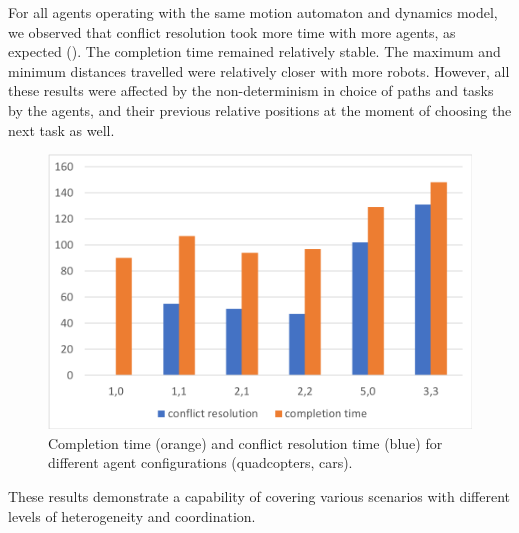  For all agents operating with the same motion automaton and dynamics model, we observed that conflict resolution took more time with more agents, as expected (). The completion time remained relatively stable. The maximum and minimum distances travelled were relatively closer with more robots. However, all these results were affected by the non-determinism in choice of paths and tasks by the agents, and their previous relative positions at the moment of choosing the next task as well. 
 
 
\begin{figure}
\includegraphics[scale=0.3]{figs/completion.png}\hfill
\caption{\small Completion time (orange) and conflict resolution time (blue)  for different agent configurations (quadcopters, cars). }
\label{fig:completionstats}
\end{figure}

These results demonstrate a capability of covering various scenarios with different levels of heterogeneity and coordination.
 
